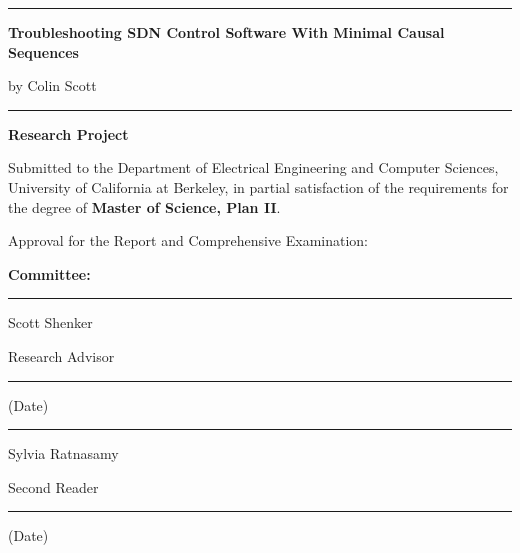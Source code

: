 \documentclass[12pt]{report}
\def\title{Troubleshooting SDN Control Software With Minimal Causal Sequences}
\def\author{Colin Scott}
\def\signatureA{Scott Shenker}
\def\signatureB{Sylvia Ratnasamy}
\begin{document}
\thispagestyle{empty}
\begin{center}
\rule{5.5in}{0.40mm}

\vspace{0.25in}
\Large{\bf\title{}}

\vspace{0.15in}
{\large by \author{}}

\vspace{0.15in}
\rule{5.5in}{0.40mm}

\vspace{0.35in}
{\large {\bf Research Project}}
\end{center}

Submitted to the Department of Electrical Engineering and
Computer Sciences, University of California at Berkeley,
in partial satisfaction of the requirements for the degree
of {\bf Master of Science, Plan II}.

\vspace{0.25in}
Approval for the Report and Comprehensive Examination:

\begin{center}
{\bf Committee:}

\vspace{0.25in}
\rule{3.5in}{0.25mm}

\signatureA

Research Advisor

\vspace{0.25in}
\rule{3.5in}{0.25mm}

(Date)

\vspace{0.25in}

\vspace{0.25in}
\rule{3.5in}{0.25mm}

\signatureB

Second Reader

\vspace{0.25in}
\rule{3.5in}{0.25mm}

(Date)
\end{center}
\newpage
\end{document}
